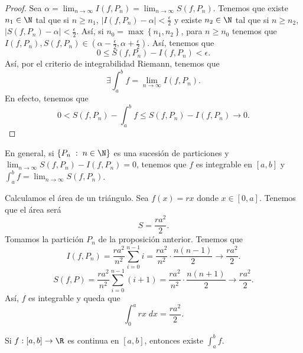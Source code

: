 \begin{proof}
Sea $\displaystyle \alpha = \lim_{n \to \infty}I\left(f,P_{n}\right) = \lim_{n \to \infty}S\left(f,P_{n}\right) $. Tenemos que existe $\displaystyle n_{1} \in \N $ tal que si $\displaystyle n \geq n_{1} $, $\displaystyle \left|I\left(f,P_{n}\right)-\alpha \right| < \frac{\epsilon }{2} $ y existe $\displaystyle n_{2} \in \N $ tal que si $\displaystyle n \geq n_{2} $, $\displaystyle \left|S\left(f,P_{n}\right)-\alpha \right|< \frac{\epsilon }{2} $. 
Así, si $\displaystyle n_{0} = \max \left\{ n_{1}, n_{2}\right\}  $, para $\displaystyle n \geq n_{0} $ tenemos que $\displaystyle I\left(f,P_{n}\right), S\left(f,P_{n}\right) \in \left(\alpha - \frac{\epsilon }{2}, \alpha + \frac{\epsilon }{2}\right) $. Así, tenemos que 
\[ 0 \leq S\left(f,P_{n}\right) - I\left(f,P_{n}\right) < \epsilon  .\]
Así, por el criterio de integrabilidad Riemann, tenemos que 
\[ \exists \int^{b}_{a} f = \lim_{n \to \infty}I\left(f,P_{n}\right) .\]
En efecto, tenemos que  
\[ 0 < S\left(f,P_{n}\right) - \int^{b}_{a} f \leq S\left(f,P_{n}\right)-I\left(f,P_{n}\right) \to 0 .\]
\end{proof}
\begin{observation}
	\normalfont En general, si $\displaystyle \left\{ P_{n} \; : \; n \in \N\right\}  $ es una sucesión de particiones y $\displaystyle \lim_{n \to \infty}S\left(f,P_{n}\right)-I\left(f,P_{n}\right)=0 $, tenemos que $\displaystyle f $ es integrable en $\displaystyle \left[a,b\right]  $ y $\displaystyle \int^{b}_{a} f = \lim_{n \to \infty}S\left(f,P_{n}\right) $.
\end{observation}
\begin{eg}
	\normalfont Calculamos el área de un triángulo. Sea $\displaystyle f\left(x\right) = rx $ donde $\displaystyle x \in [0,a] $. Tenemos que el área será
	\[ S = \frac{ra^{2}}{2} .\]
Tomamos la partición $\displaystyle P_{n} $ de la proposición anterior. Tenemos que 
\[ I\left(f,P_{n}\right) = \frac{ra^{2}}{n^{2}}\sum^{n-1}_{i = 0}i = \frac{ra^{2}}{n^{2}} \cdot \frac{n\left(n-1\right)}{2} \to \frac{ra^{2}}{2}.\]
\[S\left(f,P\right) = \frac{ra^{2}}{n^{2}}\sum^{n-1}_{i = 0}\left(i + 1\right) = \frac{ra^{2}}{n^{2}} \cdot \frac{n\left(n+1\right)}{2} \to \frac{ra^{2}}{2} .\]
Así, $f $ es integrable y queda que 
\[\int^{a}_{0} rx \; dx = \frac{ra^{2}}{2} .\]
\end{eg}
\begin{ftheorem}[]
	\normalfont Si $\displaystyle f : [a,b] \to \R$ es continua en $\displaystyle [a,b] $, entonces existe $\displaystyle \int^{b}_{a} f $.
\end{ftheorem}
